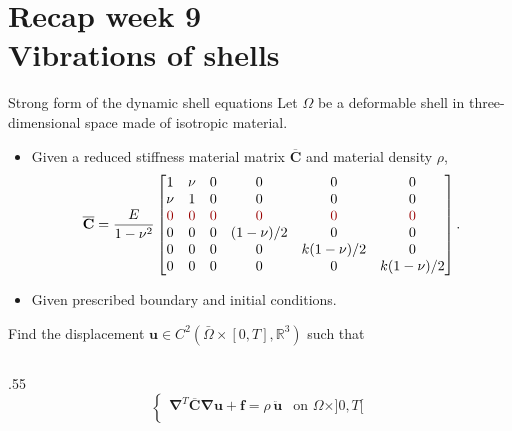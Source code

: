 \documentclass[aspectratio=169]{beamer}
\begin{document}
\section{Recap week 9 \\ Vibrations of shells}
 {
  \begin{frame}{Strong form of the dynamic shell equations}
    \small Let $\Omega$ be a deformable shell in three-dimensional space made of isotropic material.
    \begin{itemize}
      \item Given a reduced stiffness material matrix $\overline{\mathbf C}$ and material density $\rho$,
            $$\overline{\mathbf C}=\frac{E}{1-\nu^2}
              \begin{bmatrix}
                1                  & \nu                & 0                  & 0                  & 0                  & 0                  \\
                \nu                & 1                  & 0                  & 0                  & 0                  & 0                  \\
                {\color{darkred}0} & {\color{darkred}0} & {\color{darkred}0} & {\color{darkred}0} & {\color{darkred}0} & {\color{darkred}0} \\
                0                  & 0                  & 0                  & (1-\nu)/2          & 0                  & 0                  \\
                0                  & 0                  & 0                  & 0                  & k(1-\nu)/2         & 0                  \\
                0                  & 0                  & 0                  & 0                  & 0                  & k(1-\nu)/2         \\
              \end{bmatrix}.$$
      \item  Given prescribed boundary and initial conditions.
    \end{itemize}
    Find the displacement $\mathbf u\in C^{2}(\bar\Omega\times[0,T],\mathbb R^{3})$ such that
    \begin{columns}[T]
      \begin{column}{.55\textwidth}
        $$
          \begin{cases}
            \boldsymbol\nabla^T \overline{\mathbf C}\boldsymbol\nabla \mathbf u+\mathbf f=\rho\, \mathbf{\ddot{u}} & \text{on }\Omega\times]0,T[         \\

\end{cases}$$
\end{column}
\end{columns}
\end{frame}}
\end{document}
